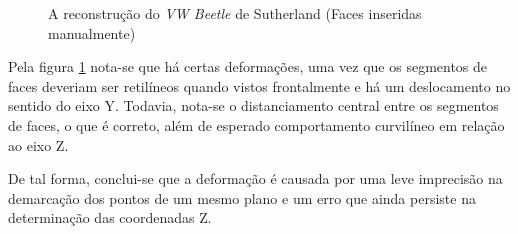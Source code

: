 			\begin{figure}[!htb]
				\centering
				\quad
				\quad
				\caption{A reconstrução do \textit{VW Beetle} de Sutherland (Faces inseridas manualmente)}
				\label{resultadosFuscaTriplo}
			\end{figure}
			
			Pela figura \ref{resultadosFuscaTriplo} nota-se que há certas deformações, uma vez que os segmentos de faces deveriam ser retilíneos quando vistos frontalmente e há um deslocamento no sentido do eixo Y. Todavia, nota-se o distanciamento central entre os segmentos de faces, o que é correto, além de esperado comportamento curvilíneo em relação ao eixo Z.
			
			De tal forma, conclui-se que a deformação é causada por uma leve imprecisão na demarcação dos pontos de um mesmo plano e um erro que ainda persiste na determinação das coordenadas Z. 
			
